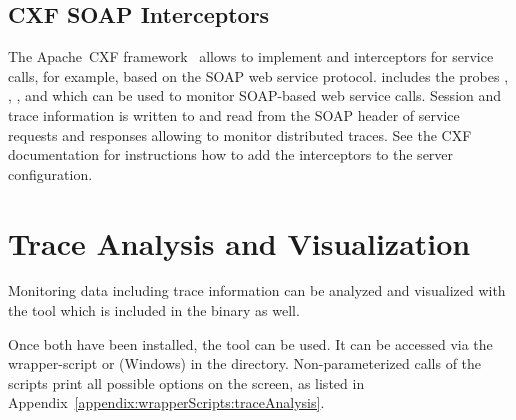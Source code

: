 \subsection{CXF SOAP Interceptors}\label{sec:traceAnalysis:instr:cxf}

The Apache~CXF framework~\cite{CXF-WebSite} allows to implement and interceptors for service calls, %
for example, based on the SOAP web service protocol. %
\Kieker{} includes the probes %
, %
, %
, and %
 which can be used to %
monitor SOAP-based web service calls. %
Session and trace information is written to and read from the SOAP header of %
service requests and responses allowing to monitor distributed traces. %
See the CXF documentation for instructions how to add the interceptors %
to the server configuration.

\section{Trace Analysis and Visualization}\label{sec:traceAnalysisTool}


Monitoring data including trace information can be analyzed and visualized with the \KiekerTraceAnalysis{} tool which is included in the \Kieker{} binary as well.\\

 \vspace{3mm}

\noindent Once both have been installed, the \KiekerTraceAnalysis{} tool can be used. It can be accessed via the wrapper-script  or  (Windows) in the  directory. Non-parameterized calls of the scripts print all possible options on the screen, as listed in Appendix~\ref{appendix:wrapperScripts:traceAnalysis}.

